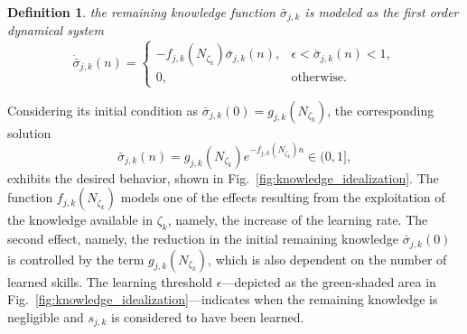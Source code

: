 \documentclass[12pt]{article}
\newtheorem{definition}{Definition}
\begin{document}
\begin{definition}\label{assumption:ode_model} the remaining knowledge function $\bar{\sigma}_{j,k}$ is modeled as the first order dynamical system
	\begin{equation}\label{eq:simple_knowledge_dynamics}
		\dot{\bar{\sigma}}_{j,k}\left(n\right)=\begin{cases}
			-f_{j,k} \left(N_{\zeta_k} \right) \bar{\sigma}_{j,k}\left(n\right), & \epsilon < \bar{\sigma}_{j,k}\left(n\right) < 1, \\
			0, & \text{otherwise}.
		\end{cases}
	\end{equation}	
\end{definition}
\noindent Considering its initial condition as $\bar{\sigma}_{j,k}(0) =  g_{j,k} \left(N_{\zeta_k}\right)$, the corresponding solution
\begin{equation}\label{eq:knowledge_exponential_form}
	\bar{\sigma}_{j,k}(n) = g_{j,k}(N_{\zeta_k}) e ^{-f_{j,k}\left(N_{\zeta_k}\right) n} \in (0,1],
\end{equation}
exhibits the desired behavior, shown in Fig.~\ref{fig:knowledge_idealization}. The function $f_{j,k}\left(N_{\zeta_k}\right)$ models one of the effects resulting from the exploitation of the knowledge available in $\zeta_k$, namely, the increase of the learning rate. The second effect, namely, the reduction in the initial remaining knowledge $\bar{\sigma}_{j,k}(0)$ is controlled by the term $g_{j,k}\left(N_{\zeta_k}\right)$, which is also dependent on the number of learned skills. The learning threshold $\epsilon$---depicted as the green-shaded area in Fig.~\ref{fig:knowledge_idealization}---indicates when the remaining knowledge is negligible and $s_{j,k}$ is considered to have been learned.
\end{document}

